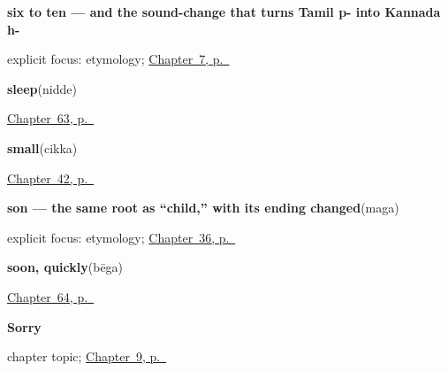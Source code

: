 \noindent\begin{minipage}[t]{\linewidth}
\raggedright
\textbf{six to ten — and the sound-change that turns Tamil p- into Kannada h-}\enspace\emph{    }\par
\footnotesize explicit focus: etymology; \hyperref[ch:ka-numbers-one-to-ten]{Chapter~7, p.~\pageref*{ch:ka-numbers-one-to-ten}}
\end{minipage}\par\smallskip

\noindent\begin{minipage}[t]{\linewidth}
\raggedright
\textbf{sleep}\enspace\emph{}\enspace(nidde)\par
\footnotesize \hyperref[ch:ka-health]{Chapter~63, p.~\pageref*{ch:ka-health}}
\end{minipage}\par\smallskip

\noindent\begin{minipage}[t]{\linewidth}
\raggedright
\textbf{small}\enspace\emph{}\enspace(cikka)\par
\footnotesize \hyperref[ch:kn-describing-things]{Chapter~42, p.~\pageref*{ch:kn-describing-things}}
\end{minipage}\par\smallskip

\noindent\begin{minipage}[t]{\linewidth}
\raggedright
\textbf{son — the same root as \textquotedblleft{}child,\textquotedblright{} with its ending changed}\enspace\emph{}\enspace(maga)\par
\footnotesize explicit focus: etymology; \hyperref[ch:ka-child-son-daughter]{Chapter~36, p.~\pageref*{ch:ka-child-son-daughter}}
\end{minipage}\par\smallskip

\noindent\begin{minipage}[t]{\linewidth}
\raggedright
\textbf{soon, quickly}\enspace\emph{}\enspace(bēga)\par
\footnotesize \hyperref[ch:ka-joining]{Chapter~64, p.~\pageref*{ch:ka-joining}}
\end{minipage}\par\smallskip

\noindent\begin{minipage}[t]{\linewidth}
\raggedright
\textbf{Sorry}\par
\footnotesize chapter topic; \hyperref[ch:ka-sorry]{Chapter~9, p.~\pageref*{ch:ka-sorry}}
\end{minipage}\par\smallskip


